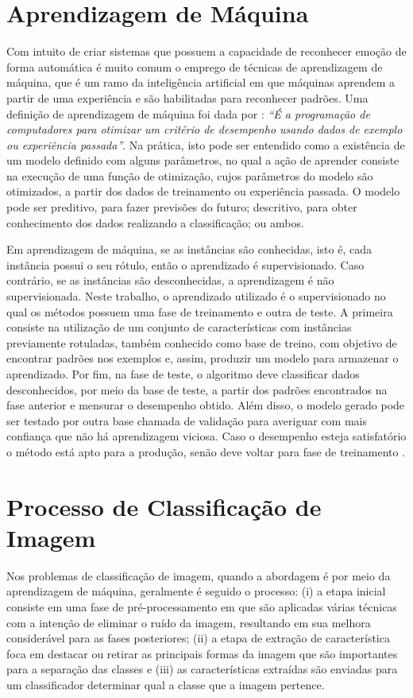 \section{Aprendizagem de Máquina}\label{sec:apm}
Com intuito de criar sistemas que possuem a capacidade de reconhecer emoção de forma automática é muito comum o emprego de técnicas de aprendizagem de máquina, que é um ramo da inteligência artificial em que máquinas aprendem a partir de uma experiência e são habilitadas para reconhecer padrões. Uma definição de aprendizagem de máquina foi dada por \cite{alpaydin2014introduction}: \emph{“É a programação de computadores para otimizar um critério de desempenho usando dados de exemplo ou experiência passada”}. Na prática, isto pode ser entendido como a existência de um modelo definido com alguns parâmetros, no qual a ação de aprender consiste na execução de uma função de otimização, cujos parâmetros do modelo são otimizados, a partir dos dados de treinamento ou experiência passada. O modelo pode ser preditivo, para fazer previsões do futuro; descritivo, para obter conhecimento dos dados realizando a classificação; ou ambos.

Em aprendizagem de máquina, se as instâncias são conhecidas, isto é,  cada  instância possui o seu rótulo, então o aprendizado é supervisionado.  Caso contrário, se as instâncias são desconhecidas, a aprendizagem é não supervisionada. Neste trabalho, o aprendizado utilizado é o supervisionado no qual os métodos possuem uma fase de treinamento e outra de teste. A primeira consiste na utilização de um conjunto de características com instâncias previamente rotuladas, também conhecido como base de treino, com objetivo de encontrar padrões nos exemplos e, assim, produzir um modelo para armazenar o aprendizado. Por fim, na fase de teste, o algoritmo deve classificar dados desconhecidos, por meio da base de teste, a partir dos padrões encontrados na fase anterior e mensurar o desempenho obtido. Além disso, o modelo gerado pode ser testado por outra base chamada de validação para averiguar com mais confiança que não há aprendizagem viciosa. Caso o desempenho esteja satisfatório o método está apto para a produção, senão deve voltar para fase de treinamento \citep{kotsiantis2007supervised, geron2017hands}.

\section{Processo de Classificação de Imagem}\label{sec:pci}
Nos problemas de classificação de imagem, quando a abordagem é por meio da aprendizagem de máquina, geralmente é seguido o processo: (i) a etapa inicial consiste em uma fase de pré-processamento em que são aplicadas várias técnicas com a intenção de eliminar o ruído da imagem, resultando em sua melhora considerável para as fases posteriores; (ii) a etapa de extração de característica foca em destacar ou retirar as principais formas da imagem que são importantes para a separação das classes e (iii) as características extraídas são enviadas para um classificador determinar qual a classe que a imagem pertence.

